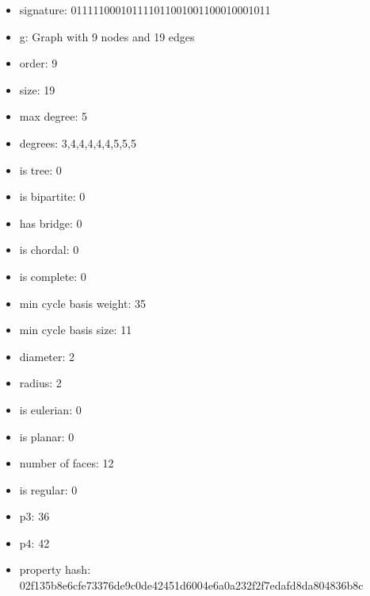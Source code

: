 \newpage
\begin{figure}
\end{figure}
\begin{itemize}
\item signature: 011111000101111011001001100010001011
\item g: Graph with 9 nodes and 19 edges
\item order: 9
\item size: 19
\item max degree: 5
\item degrees: 3,4,4,4,4,4,5,5,5
\item is tree: 0
\item is bipartite: 0
\item has bridge: 0
\item is chordal: 0
\item is complete: 0
\item min cycle basis weight: 35
\item min cycle basis size: 11
\item diameter: 2
\item radius: 2
\item is eulerian: 0
\item is planar: 0
\item number of faces: 12
\item is regular: 0
\item p3: 36
\item p4: 42
\item property hash: 02f135b8e6cfe73376de9c0de42451d6004e6a0a232f2f7edafd8da804836b8c
\end{itemize}
